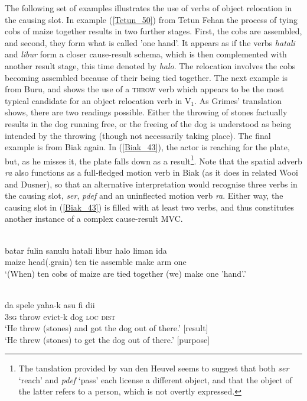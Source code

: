 The following set of examples illustrates the use of verbs of object relocation in the causing slot. In example (\ref{Tetun_50}) from Tetun Fehan the process of tying cobs of maize together results in two further stages. First, the cobs are assembled, and second, they form what is called 'one hand'. It appears as if the verbs \textit{hatali} and \textit{libur} form a closer cause-result schema, which is then complemented with another result stage, this time denoted by \textit{halo}. The relocation involves the cobs becoming assembled because of their being tied together. The next example is from Buru, and shows the use of a \textsc{throw} verb which appears to be the most typical candidate for an object relocation verb in V$_1$. As Grimes' translation shows, there are two readings possible. Either the throwing of stones factually results in the dog running free, or the freeing of the dog is understood as being intended by the throwing (though not necessarily taking place). The final example is from Biak again. In (\ref{Biak_43}), the actor is reaching for the plate, but, as he misses it, the plate falls down as a result\footnote{The tanslation provided by van den Heuvel seems to suggest that both \textit{ser} `reach' and \textit{pdef} `pass' each license a different object, and that the object of the latter refers to a person, which is not overtly expressed.}. Note that the spatial adverb \textit{ra} also functions as a full-fledged motion verb in Biak (as it does in related Wooi and Dusner), so that an alternative interpretation would recognise three verbs in the causing slot, \textit{ser}, \textit{pdef} and an uninflected motion verb \textit{ra}. Either way, the causing slot in (\ref{Biak_43}) is filled with at least two verbs, and thus constitutes another instance of a complex cause-result MVC.

\ea \label{Tetun_50}
\\
\gll batar fulin sanulu hatali libur halo liman ida \\
maize head(.grain) ten tie assemble make arm one \\
\glft `(When) ten cobs of maize are tied together (we) make one 'hand'.'\\ 
\z

\ea \label{Buru_21}
\\
\gll da spele yaha-k asu fi dii \\
3\textsc{sg} throw evict-k dog \textsc{loc} \textsc{dist} \\
\glft `He threw (stones) and got the dog out of there.' [result] \\
`He threw (stones) to get the dog out of there.' [purpose]\\ 
\z

